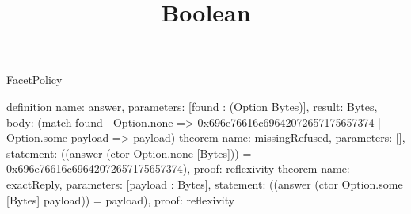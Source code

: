 \begin{lexlean}{FacetPolicy}
\title{Boolean}
\begin{semanticmodule}
definition{
  name: answer, parameters: [found : (Option Bytes)], result: Bytes,
  body: (match found | Option.none => 0x696e76616c69642072657175657374 | Option.some payload => payload)
}
theorem{
  name: missingRefused, parameters: [],
  statement: ((answer (ctor Option.none [Bytes])) = 0x696e76616c69642072657175657374),
  proof: reflexivity{}
}
theorem{
  name: exactReply, parameters: [payload : Bytes],
  statement: ((answer (ctor Option.some [Bytes] payload)) = payload),
  proof: reflexivity{}
}
\end{semanticmodule}
\end{lexlean}
